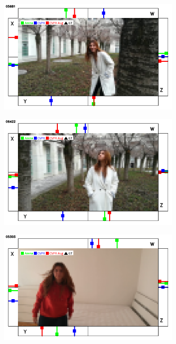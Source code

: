 \begin{figure}[H]
	\begin{center}
		\begin{subfigure}[h]{0.49\textwidth}
			\centering
			\includegraphics[width=0.98\textwidth]{"contents/images/qualitative-videos/perfect1-square01-5681"}
		\end{subfigure}
		\hfill
		\begin{subfigure}[h]{0.49\textwidth}
			\centering
			\includegraphics[width=0.98\textwidth]{"contents/images/qualitative-videos/perfect1-square01-6422"}
		\end{subfigure}
		\vfill
		\begin{subfigure}[h]{0.49\textwidth}
			\centering
			\includegraphics[width=0.98\textwidth]{"contents/images/qualitative-videos/perfect2-house01-5303"}

\end{subfigure}
\end{center}
\end{figure}
